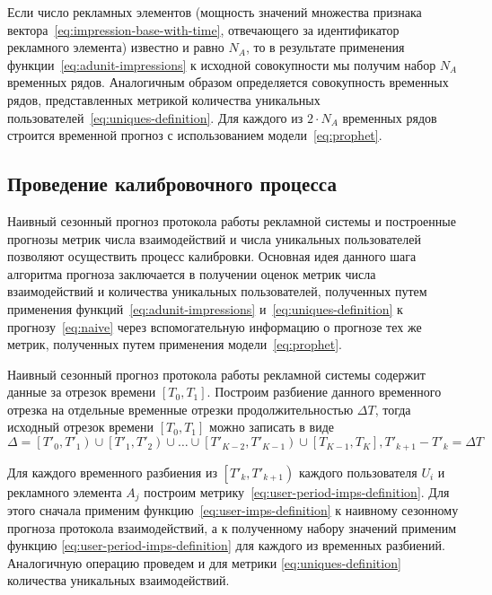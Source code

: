 Если число рекламных элементов (мощность значений множества признака вектора~\eqref{eq:impression-base-with-time},
отвечающего за идентификатор рекламного элемента) известно и равно $N_A$, то в результате применения 
функции~\eqref{eq:adunit-impressions} к исходной совокупности мы получим набор $N_A$ временных рядов. Аналогичным образом
определяется совокупность временных рядов, представленных метрикой количества уникальных 
пользователей~\eqref{eq:uniques-definition}. Для каждого из $2 \cdot N_A$ временных рядов строится временной прогноз с 
использованием модели~\eqref{eq:prophet}.

\subsection{Проведение калибровочного процесса}
Наивный сезонный прогноз протокола работы рекламной системы и построенные прогнозы метрик числа взаимодействий и числа
уникальных пользователей позволяют осуществить процесс калибровки. Основная идея данного шага алгоритма прогноза заключается
в получении оценок метрик числа взаимодействий и количества уникальных пользователей, полученных путем применения 
функций~\eqref{eq:adunit-impressions} и~\eqref{eq:uniques-definition} к прогнозу~\eqref{eq:naive} через
вспомогательную информацию о прогнозе тех же метрик, полученных путем применения модели~\eqref{eq:prophet}.

Наивный сезонный прогноз протокола работы рекламной системы содержит данные за отрезок времени $\left[T_0, T_1\right]$.
Построим разбиение данного временного отрезка на отдельные временные отрезки продолжительностью $\Delta T$, тогда исходный
отрезок времени $\left[T_0, T_1\right]$ можно записать в виде
\begin{equation}
    \Delta = \left[T'_0, T'_1\right) \cup \left[T'_1, T'_2\right)
    \cup \dots \cup \left[T'_{K-2}, T'_{K-1}\right) \cup \left[T_{K-1}, T_K\right], T'_{k+1} - T'_{k} = \Delta T
\end{equation}

Для каждого временного разбиения из $\left[T'_k, T'_{k+1}\right)$ каждого пользователя $U_i$ и рекламного элемента 
$A_j$ построим метрику~\eqref{eq:user-period-imps-definition}. Для этого сначала применим 
функцию~\eqref{eq:user-imps-definition} к наивному сезонному прогноза протокола взаимодействий, а к полученному набору 
значений применим функцию \eqref{eq:user-period-imps-definition} для каждого из временных разбиений. Аналогичную 
операцию проведем и для метрики \eqref{eq:uniques-definition} количества уникальных взаимодействий.

